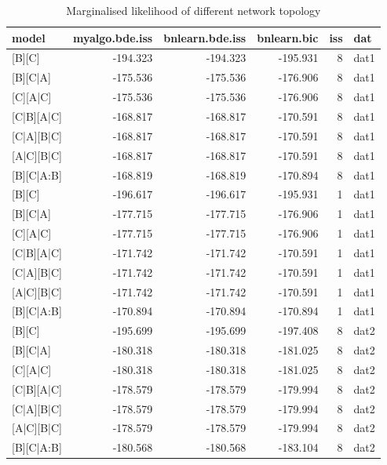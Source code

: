 \documentclass[]{article}
\theoremstyle{definition}
\theoremstyle{definition}
\theoremstyle{definition}
\theoremstyle{remark}
\begin{document}
\begin{table}

\caption{\label{tab:likelihood}Marginalised likelihood of different network topology}
\centering
\begin{tabular}[t]{l|r|r|r|r|l}
\hline
model & myalgo.bde.iss & bnlearn.bde.iss & bnlearn.bic & iss & dat\\
\hline
[A][B][C] & -194.323 & -194.323 & -195.931 & 8 & dat1\\
\hline
[A][B][C|A] & -175.536 & -175.536 & -176.906 & 8 & dat1\\
\hline
[B][C][A|C] & -175.536 & -175.536 & -176.906 & 8 & dat1\\
\hline
[B][C|B][A|C] & -168.817 & -168.817 & -170.591 & 8 & dat1\\
\hline
[A][C|A][B|C] & -168.817 & -168.817 & -170.591 & 8 & dat1\\
\hline
[C][A|C][B|C] & -168.817 & -168.817 & -170.591 & 8 & dat1\\
\hline
[A][B][C|A:B] & -168.819 & -168.819 & -170.894 & 8 & dat1\\
\hline
[A][B][C] & -196.617 & -196.617 & -195.931 & 1 & dat1\\
\hline
[A][B][C|A] & -177.715 & -177.715 & -176.906 & 1 & dat1\\
\hline
[B][C][A|C] & -177.715 & -177.715 & -176.906 & 1 & dat1\\
\hline
[B][C|B][A|C] & -171.742 & -171.742 & -170.591 & 1 & dat1\\
\hline
[A][C|A][B|C] & -171.742 & -171.742 & -170.591 & 1 & dat1\\
\hline
[C][A|C][B|C] & -171.742 & -171.742 & -170.591 & 1 & dat1\\
\hline
[A][B][C|A:B] & -170.894 & -170.894 & -170.894 & 1 & dat1\\
\hline
[A][B][C] & -195.699 & -195.699 & -197.408 & 8 & dat2\\
\hline
[A][B][C|A] & -180.318 & -180.318 & -181.025 & 8 & dat2\\
\hline
[B][C][A|C] & -180.318 & -180.318 & -181.025 & 8 & dat2\\
\hline
[B][C|B][A|C] & -178.579 & -178.579 & -179.994 & 8 & dat2\\
\hline
[A][C|A][B|C] & -178.579 & -178.579 & -179.994 & 8 & dat2\\
\hline
[C][A|C][B|C] & -178.579 & -178.579 & -179.994 & 8 & dat2\\
\hline
[A][B][C|A:B] & -180.568 & -180.568 & -183.104 & 8 & dat2\\

\end{tabular}
\end{table}
\end{document}
